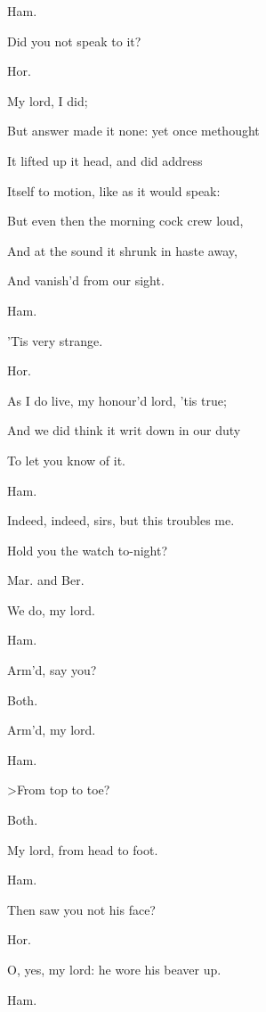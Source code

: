 \documentclass[12pt]{book}
\begin{document}
Ham.

Did you not speak to it?



Hor.

My lord, I did;

But answer made it none: yet once methought

It lifted up it head, and did address

Itself to motion, like as it would speak:

But even then the morning cock crew loud,

And at the sound it shrunk in haste away,

And vanish'd from our sight.



Ham.

'Tis very strange.



Hor.

As I do live, my honour'd lord, 'tis true;

And we did think it writ down in our duty

To let you know of it.



Ham.

Indeed, indeed, sirs, but this troubles me.

Hold you the watch to-night?



Mar. and Ber.

We do, my lord.



Ham.

Arm'd, say you?



Both.

Arm'd, my lord.



Ham.

>From top to toe?



Both.

My lord, from head to foot.



Ham.

Then saw you not his face?



Hor.

O, yes, my lord: he wore his beaver up.



Ham.
\end{document}
